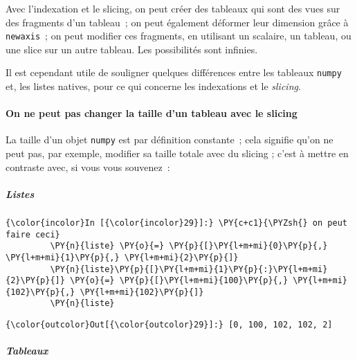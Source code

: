     Avec l'indexation et le slicing, on peut créer des tableaux qui sont des
vues sur des fragments d'un tableau~; on peut également déformer leur
dimension grâce à \texttt{newaxis}~; on peut modifier ces fragments, en
utilisant un scalaire, un tableau, ou une slice sur un autre tableau.
Les possibilités sont infinies.

    Il est cependant utile de souligner quelques différences entre les
tableaux \texttt{numpy} et, les listes natives, pour ce qui concerne les
indexations et le \emph{slicing}.

    \hypertarget{on-ne-peut-pas-changer-la-taille-dun-tableau-avec-le-slicing}{%
\paragraph{On ne peut pas changer la taille d'un tableau avec le
slicing}\label{on-ne-peut-pas-changer-la-taille-dun-tableau-avec-le-slicing}}

La taille d'un objet \texttt{numpy} est par définition constante~; cela
signifie qu'on ne peut pas, par exemple, modifier sa taille totale avec
du slicing ; c'est à mettre en contraste avec, si vous vous souvenez~:

    \hypertarget{listes}{%
\subparagraph{Listes}\label{listes}}

    \begin{Verbatim}[commandchars=\\\{\},frame=single,framerule=0.3mm,rulecolor=\color{cellframecolor}]
{\color{incolor}In [{\color{incolor}29}]:} \PY{c+c1}{\PYZsh{} on peut faire ceci}
         \PY{n}{liste} \PY{o}{=} \PY{p}{[}\PY{l+m+mi}{0}\PY{p}{,} \PY{l+m+mi}{1}\PY{p}{,} \PY{l+m+mi}{2}\PY{p}{]}
         \PY{n}{liste}\PY{p}{[}\PY{l+m+mi}{1}\PY{p}{:}\PY{l+m+mi}{2}\PY{p}{]} \PY{o}{=} \PY{p}{[}\PY{l+m+mi}{100}\PY{p}{,} \PY{l+m+mi}{102}\PY{p}{,} \PY{l+m+mi}{102}\PY{p}{]}
         \PY{n}{liste}
\end{Verbatim}


\begin{Verbatim}[commandchars=\\\{\},frame=single,framerule=0.3mm,rulecolor=\color{cellframecolor}]
{\color{outcolor}Out[{\color{outcolor}29}]:} [0, 100, 102, 102, 2]
\end{Verbatim}
            
    \hypertarget{tableaux}{%
\subparagraph{Tableaux}\label{tableaux}}

